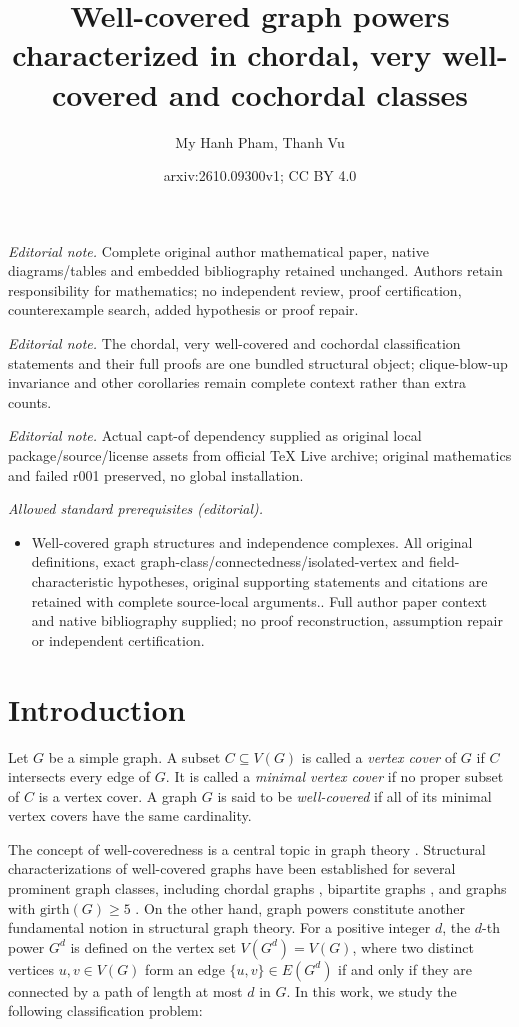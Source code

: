 \documentclass[10pt,a4paper]{amsart}
\title{Well-covered graph powers characterized in chordal, very well-covered and cochordal classes}
\author{My Hanh Pham, Thanh Vu}
\date{arxiv:2610.09300v1; CC BY 4.0}
\numberwithin{equation}{section}
\theoremstyle{definition}
\begin{document}
\maketitle
\noindent\textit{Editorial note.} Complete original author mathematical paper, native diagrams/tables and embedded bibliography retained unchanged. Authors retain responsibility for mathematics; no independent review, proof certification, counterexample search, added hypothesis or proof repair.\par\medskip
\noindent\textit{Editorial note.} The chordal, very well-covered and cochordal classification statements and their full proofs are one bundled structural object; clique-blow-up invariance and other corollaries remain complete context rather than extra counts.\par\medskip
\noindent\textit{Editorial note.} Actual capt-of dependency supplied as original local package/source/license assets from official TeX Live archive; original mathematics and failed r001 preserved, no global installation.\par\medskip
\noindent\textit{Allowed standard prerequisites (editorial).}\begin{itemize}
\item Well-covered graph structures and independence complexes. All original definitions, exact graph-class/connectedness/isolated-vertex and field-characteristic hypotheses, original supporting statements and citations are retained with complete source-local arguments.. Full author paper context and native bibliography supplied; no proof reconstruction, assumption repair or independent certification.
\end{itemize}\medskip
\section{Introduction}
  \label{sec1} 

Let $G$ be a simple graph. A subset $C \subseteq V(G)$ is called a \emph{vertex cover} of $G$ if $C$ intersects every edge of $G$. It is called a \emph{minimal vertex cover} if no proper subset of $C$ is a vertex cover. A graph $G$ is said to be \emph{well-covered} if all of its minimal vertex covers have the same cardinality. 

The concept of well-coveredness is a central topic in graph theory \cite{BM, P}. Structural characterizations of well-covered graphs have been established for several prominent graph classes, including chordal graphs \cite{PTV}, bipartite graphs \cite{R}, and graphs with $\text{girth}(G) \ge 5$ \cite{FHN}. On the other hand, graph powers constitute another fundamental notion in structural graph theory. For a positive integer $d$, the $d$-th power $G^d$ is defined on the vertex set $V(G^d) = V(G)$, where two distinct vertices $u, v \in V(G)$ form an edge $\{u, v\} \in E(G^d)$ if and only if they are connected by a path of length at most $d$ in $G$. In this work, we study the following classification problem:
\end{document}
